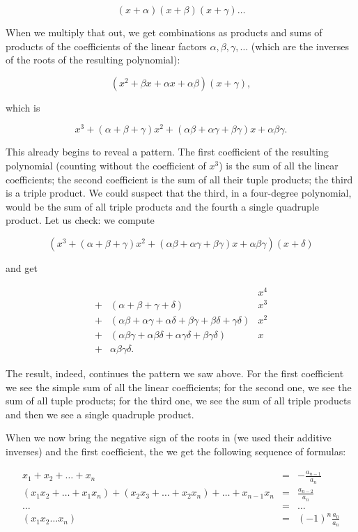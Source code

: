 \documentclass[tikz]{scrreprt}
\begin{document}
\[
(x+\alpha)(x+\beta)(x+\gamma)\dots
\]

When we multiply that out, we get combinations
as products and sums of products
of the coefficients of the linear factors
$\alpha, \beta, \gamma, \dots$
(which are the inverses of the roots 
of the resulting polynomial):

\[
(x^2 + \beta x + \alpha x + \alpha\beta)(x+\gamma),
\]

which is

\[
x^3 + 
(\alpha + \beta + \gamma) x^2 + 
(\alpha\beta + \alpha\gamma + \beta\gamma)x +
\alpha\beta\gamma.
\]

This already begins to reveal a pattern.
The first coefficient of the resulting polynomial
(counting without the coefficient of $x^3$)
is the sum of all the linear coefficients;
the second coefficient is the sum of all their
tuple products; the third is a triple product.
We could suspect that the third, in a 
four-degree polynomial, would be the sum
of all triple products and the fourth a
single quadruple product. Let us check:
we compute

\[
(x^3 + 
(\alpha + \beta + \gamma) x^2 + 
(\alpha\beta + \alpha\gamma + \beta\gamma)x +
\alpha\beta\gamma)(x + \delta)
\]

and get

\[
\begin{array}{cll}
    &  & x^4   \\
  + & (\alpha + \beta + \gamma + \delta) & x^3   \\
  + & (\alpha\beta + \alpha\gamma + \alpha\delta +
     \beta\gamma + \beta\delta + \gamma\delta) & x^2   \\
  + & (\alpha\beta\gamma + \alpha\beta\delta + \alpha\gamma\delta +
     \beta\gamma\delta) & x   \\
  + & \alpha\beta\gamma\delta. &
\end{array}
\]

The result, indeed, continues the pattern we saw above.
For the first coefficient we see the simple sum 
of all the linear coefficients;
for the second one, we see the sum of all tuple products;
for the third one, we see the sum of all triple products
and then we see a single quadruple product.

When we now bring the negative sign of the roots in
(we used their additive inverses) and
the first coefficient, the we get the following
sequence of formulas:

\begin{subequations}\label{eq:vieta1}
\begin{align}
x_1 + x_2 + \dots + x_n & = & -\frac{a_{n-1}}{a_n}\\
(x_1x_2 + \dots + x_1x_n) + 
(x_2x_3 + \dots + x_2x_n) + \dots + 
x_{n-1}x_n & = & \frac{a_{n-2}}{a_n}\\
\dots & = & \dots\\
(x_1x_2 \dots x_n) & = & (-1)^n\frac{a_0}{a_n}
\end{align}
\end{subequations}
\end{document}
